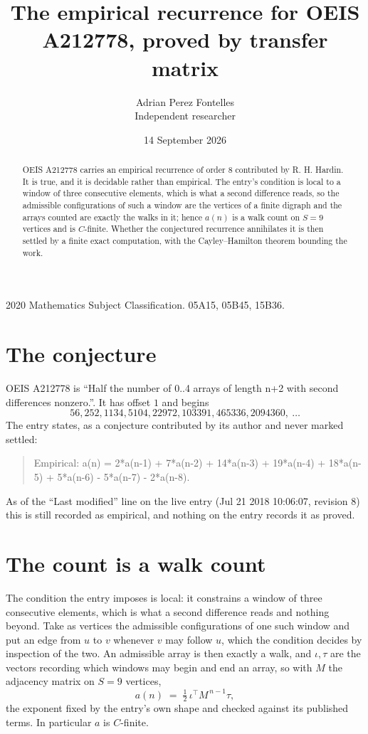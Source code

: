 \documentclass[11pt,a4paper]{article}
\title{The empirical recurrence for OEIS A212778, proved by transfer matrix}
\author{Adrian Perez Fontelles\\ \small Independent researcher}
\date{14 September 2026}
\theoremstyle{plain}
\theoremstyle{definition}
\begin{document}
\maketitle

\begin{abstract}
OEIS A212778 carries an empirical recurrence of order $8$ contributed by R. H. Hardin. It is
true, and it is decidable rather than empirical. The entry's condition is local to a window of three consecutive elements, which is what a second difference reads, so
the admissible configurations of such a window are the vertices of a finite digraph and the
arrays counted are exactly the walks in it; hence $a(n)$ is a walk count on $S=9$ vertices
and is $C$-finite. Whether the conjectured recurrence annihilates it is then settled by a
finite exact computation, with the Cayley--Hamilton theorem bounding the work.
\end{abstract}

\noindent\small 2020 Mathematics Subject Classification. 05A15, 05B45, 15B36.\normalsize

\section{The conjecture}

OEIS A212778 is ``Half the number of 0..4 arrays of length n+2 with second differences nonzero.''. It has offset $1$ and begins
\[
56, 252, 1134, 5104, 22972, 103391, 465336, 2094360,\ \dots
\]
The entry states, as a conjecture contributed by its author and never marked settled:
\begin{quote}
Empirical: a(n) = 2*a(n-1) + 7*a(n-2) + 14*a(n-3) + 19*a(n-4) + 18*a(n-5) + 5*a(n-6) - 5*a(n-7) - 2*a(n-8).
\end{quote}
As of the ``Last modified'' line on the live entry (Jul 21 2018 10:06:07, revision 8) this is still
recorded as empirical, and nothing on the entry records it as proved.

\section{The count is a walk count}

The condition the entry imposes is local: it constrains a window of three consecutive elements, which is what a second difference reads and nothing beyond. Take as vertices the admissible configurations of one such window and put an edge from $u$ to $v$ whenever $v$ may follow $u$, which the condition decides by inspection of the two.
An admissible array is then exactly a walk, and $\iota,\tau$ are the vectors recording which windows may begin and end an array, so with $M$ the adjacency matrix on $S=9$ vertices,
\[
a(n)\;=\;\tfrac{1}{2}\,\iota^{\!\top}M^{\,n-1}\tau ,
\]
the exponent fixed by the entry's own shape and checked against its published terms. In
particular $a$ is $C$-finite.
\end{document}
